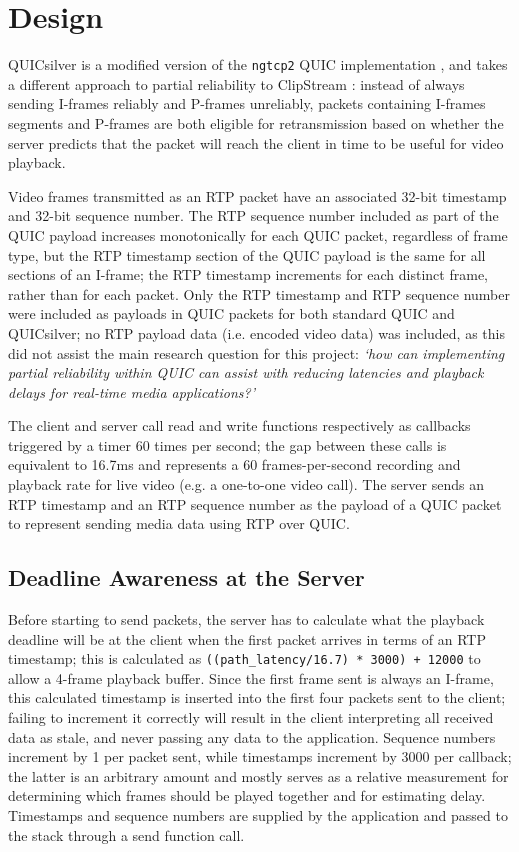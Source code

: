 \documentclass{mpaper}
\begin{document}
\section{Design}

QUICsilver is a modified version of the \texttt{ngtcp2} QUIC implementation \cite{ngtcp2}, and takes a different approach to partial reliability to ClipStream \cite{Palmer2018}: instead of always sending I-frames reliably and P-frames unreliably, packets containing I-frames segments and P-frames are both eligible for retransmission based on whether the server predicts that the packet will reach the client in time to be useful for video playback. 

Video frames transmitted as an RTP packet have an associated 32-bit timestamp and 32-bit sequence number. The RTP sequence number included as part of the QUIC payload increases monotonically for each QUIC packet, regardless of frame type, but the RTP timestamp section of the QUIC payload is the same for all sections of an I-frame; the RTP timestamp increments for each distinct frame, rather than for each packet. Only the RTP timestamp and RTP sequence number were included as payloads in QUIC packets for both standard QUIC and QUICsilver; no RTP payload data (i.e. encoded video data) was included, as this did not assist the main research question for this project: \textit{`how can implementing partial reliability within QUIC can assist with reducing latencies and playback delays for real-time media applications?'}

The client and server call read and write functions respectively as callbacks triggered by a timer 60 times per second; the gap between these calls is equivalent to 16.7ms and represents a 60 frames-per-second recording and playback rate for live video (e.g. a one-to-one video call). The server sends an RTP timestamp and an RTP sequence number as the payload of a QUIC packet to represent sending media data using RTP over QUIC.

\subsection{Deadline Awareness at the Server}
Before starting to send packets, the server has to calculate what the playback deadline will be at the client when the first packet arrives in terms of an RTP timestamp; this is calculated as \texttt{((path\_latency/16.7) * 3000) + 12000} to allow a 4-frame playback buffer. Since the first frame sent is always an I-frame, this calculated timestamp is inserted into the first four packets sent to the client; failing to increment it correctly will result in the client interpreting all received data as stale, and never passing any data to the application. Sequence numbers increment by 1 per packet sent, while timestamps increment by 3000 per callback; the latter is an arbitrary amount and mostly serves as a relative measurement for determining which frames should be played together and for estimating delay. Timestamps and sequence numbers are supplied by the application and passed to the stack through a send function call.
\end{document}
